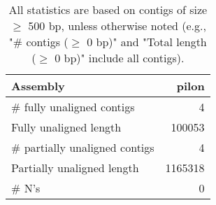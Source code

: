 \documentclass[12pt,a4paper]{article}
\begin{document}
\begin{table}[ht]
\begin{center}
\caption{All statistics are based on contigs of size $\geq$ 500 bp, unless otherwise noted (e.g., "\# contigs ($\geq$ 0 bp)" and "Total length ($\geq$ 0 bp)" include all contigs).}
\begin{tabular}{|l*{1}{|r}|}
\hline
Assembly & pilon \\ \hline
\# fully unaligned contigs & 4 \\ \hline
Fully unaligned length & 100053 \\ \hline
\# partially unaligned contigs & 4 \\ \hline
Partially unaligned length & 1165318 \\ \hline
\# N's & 0 \\ \hline
\end{tabular}
\end{center}
\end{table}
\end{document}

